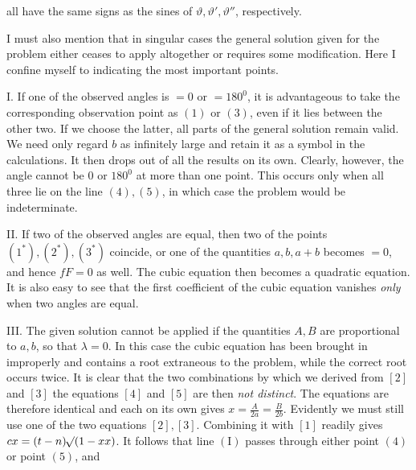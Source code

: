 %
all have the same signs as the sines of \(\vartheta,\vartheta',\vartheta''\), respectively.

I must also mention that in singular cases the general solution given for the problem either ceases to apply altogether or requires some modification. Here I confine myself to indicating the most important points.

I. If one of the observed angles is \(=0\) or \(=180^0\), it is advantageous to take the corresponding observation point as \((1)\) or \((3)\), even if it lies between the other two. If we choose the latter, all parts of the general solution remain valid. We need only regard \(b\) as infinitely large and retain it as a symbol in the calculations. It then drops out of all the results on its own. Clearly, however, the angle cannot be \(0\) or \(180^0\) at more than one point. This occurs only when all three lie on the line \((4),(5)\), in which case the problem would be indeterminate.

II. If two of the observed angles are equal, then two of the points \((1^*),(2^*),(3^*)\) coincide, or one of the quantities \(a,b,a+b\) becomes \(=0\), and hence \(fF=0\) as well. The cubic equation then becomes a quadratic equation. It is also easy to see that the first coefficient of the cubic equation vanishes \textit{only} when two angles are equal.

III. The given solution cannot be applied if the quantities \(A,B\) are proportional to \(a,b\), so that \(\lambda=0\). In this case the cubic equation has been brought in improperly and contains a root extraneous to the problem, while the correct root occurs twice. It is clear that the two combinations by which we derived from \([2]\) and \([3]\) the equations \([4]\) and \([5]\) are then \textit{not distinct}. The equations are therefore identical and each on its own gives \(x=\frac A{2a}=\frac B{2b}\). Evidently we must still use one of the two equations \([2],[3]\). Combining it with \([1]\) readily gives \(cx=(t-n)\mathord{{}^{}\!\surd}(1-xx)\). It follows that line \(\mathrm{(I)}\) passes through either point \((4)\) or point \((5)\), and
